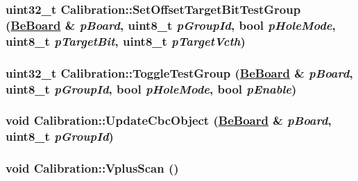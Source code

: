 \hypertarget{class_calibration_e61d5cd4dfc7b3725ee2f5d734860627}{
\subsubsection[SetOffsetTargetBitTestGroup]{\setlength{\rightskip}{0pt plus 5cm}uint32\_\-t Calibration::Set\-Offset\-Target\-Bit\-Test\-Group (\hyperlink{class_ph2___hw_description_1_1_be_board}{Be\-Board} \& {\em p\-Board}, uint8\_\-t {\em p\-Group\-Id}, bool {\em p\-Hole\-Mode}, uint8\_\-t {\em p\-Target\-Bit}, uint8\_\-t {\em p\-Target\-Vcth})}}
\label{class_calibration_e61d5cd4dfc7b3725ee2f5d734860627}


\hypertarget{class_calibration_cc42b29fa0301ecab251a51902603765}{
\subsubsection[ToggleTestGroup]{\setlength{\rightskip}{0pt plus 5cm}uint32\_\-t Calibration::Toggle\-Test\-Group (\hyperlink{class_ph2___hw_description_1_1_be_board}{Be\-Board} \& {\em p\-Board}, uint8\_\-t {\em p\-Group\-Id}, bool {\em p\-Hole\-Mode}, bool {\em p\-Enable})}}
\label{class_calibration_cc42b29fa0301ecab251a51902603765}


\hypertarget{class_calibration_e68b10877c53dc83483e90391ce4b9ac}{
\subsubsection[UpdateCbcObject]{\setlength{\rightskip}{0pt plus 5cm}void Calibration::Update\-Cbc\-Object (\hyperlink{class_ph2___hw_description_1_1_be_board}{Be\-Board} \& {\em p\-Board}, uint8\_\-t {\em p\-Group\-Id})}}
\label{class_calibration_e68b10877c53dc83483e90391ce4b9ac}


\hypertarget{class_calibration_22a49d922a44c44eb1c5a7222c80e61a}{
\subsubsection[VplusScan]{\setlength{\rightskip}{0pt plus 5cm}void Calibration::Vplus\-Scan ()}}
\label{class_calibration_22a49d922a44c44eb1c5a7222c80e61a}





